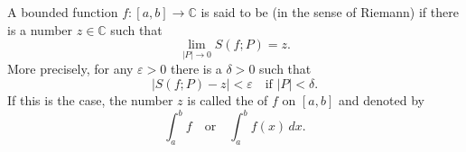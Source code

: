 A bounded function $f: [a, b] \to \mathbb{C}$ is said to be  (in the sense of Riemann) if there is a number $z \in \mathbb{C}$ such that
$$\lim_{|P| \to 0} S(f; P) = z.$$
More precisely, for any $\varepsilon > 0$ there is a $\delta > 0$ such that
$$|S(f; P) - z| < \varepsilon \quad \text{if } |P| < \delta.$$
If this is the case, the number $z$ is called the  of $f$ on $[a, b]$ and denoted by
$$\int_a^b f \quad \text{or} \quad \int_a^b f(x) \, dx.$$
